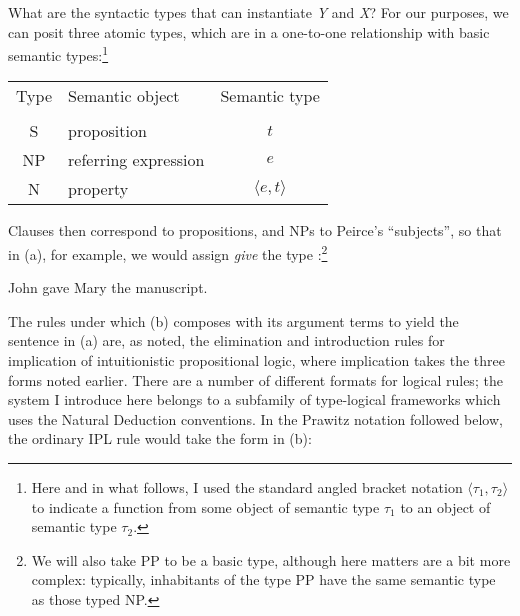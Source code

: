 \documentclass[output=paper,colorlinks,citecolor=brown]{langscibook}
\begin{document}
What are the syntactic types that can instantiate \textit{Y} and \textit{X}? For our
purposes, we can posit three atomic types, which are in a
one-to-one relationship with basic semantic types:\footnote{Here and
in what follows, I used the standard angled bracket notation
$\langle\tau_1,\tau_2\rangle$ to indicate a function from some object
of semantic type $\tau_1$ to an object of semantic type $\tau_2$.}

\begin{exe}
 \ex\label{types}
\begin{tabular}{clc}
\textsf{Type} & \textsf{Semantic object} & \textsf{Semantic type} \\
 & & \\
S & proposition & $t$\\
NP & referring expression & $e$ \\
N  & property & $\langle e,t\rangle$ \\
\end{tabular}
\end{exe}
Clauses then correspond to propositions, and NPs to Peirce's
``subjects'', so that in (a), for example, we would assign \textit{give}
the type :\footnote{We will also take PP to be a basic type,
although here matters are a bit more complex: typically, inhabitants of
the type PP have the same semantic type as those typed NP.}


\begin{exe}
 \ex\label{example}
  \begin{xlist}
 \ex\label{}
    John gave Mary the manuscript.
 \ex\label{}
  \end{xlist}
\end{exe}
The rules under which (b) composes with its argument terms to
yield the sentence in (a) are, as noted, the elimination and
introduction rules for implication of intuitionistic propositional
logic, where implication takes the three forms noted earlier. There
are a number of different formats for logical rules; the system I
introduce here belongs to a subfamily of type-logical frameworks which
uses the Natural Deduction conventions. In the Prawitz notation followed
below, the ordinary IPL rule would take the form in (b):
\end{document}
